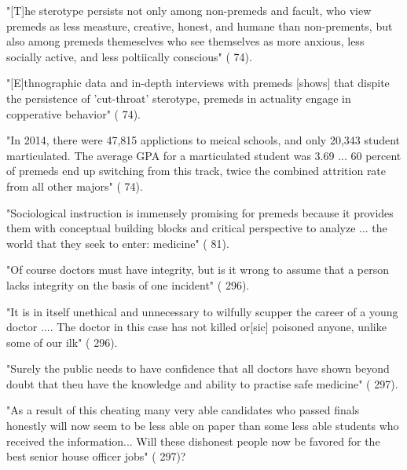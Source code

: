 "[T]he sterotype persists not only among non-premeds and facult, who view premeds as less measture, creative, honest, and humane than non-prements, but also among premeds themeselves who see themselves as more anxious, less socially active, and less poltiically conscious" (\cite{Olsen-2016} 74).

"[E]thnographic data and in-depth interviews with premeds [shows] that dispite the persistence of 'cut-throat' sterotype, premeds in actuality engage in copperative behavior" (\cite{Olsen-2016} 74).

"In 2014, there were 47,815 applictions to meical schools, and only 20,343 student marticulated. The average GPA for a marticulated student was 3.69 ... 60 percent of premeds end up switching from this track, twice the combined attrition rate from all other majors" (\cite{Olsen-2016} 74).

"Sociological instruction is immensely promising for premeds because it provides them with conceptual building blocks and critical perspective to analyze ... the world that they seek to enter: medicine" (\cite{Olsen-2016} 81).


"Of course doctors must have integrity, but is it wrong to assume that a person lacks integrity on the basis of one incident" (\cite{Spencer-2001} 296).

"It is in itself unethical and unnecessary to wilfully scupper the career of a young doctor .... The doctor in this case has not killed or[sic] poisoned anyone, unlike some of our ilk" (\cite{Spencer-2001} 296).

"Surely the public needs to have confidence that all doctors have shown beyond doubt that theu have the knowledge and ability to practise safe medicine" (\cite{Spencer-2001} 297).

"As a result of this cheating many very able candidates who passed finals honestly will now seem to be less able on paper than some less able students who received the information... Will these dishonest people now be favored for the best senior house officer jobs" (\cite{Spencer-2001} 297)?
